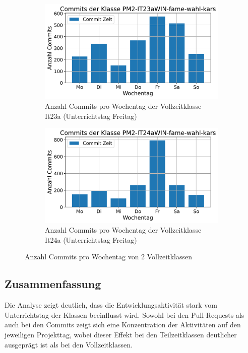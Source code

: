 \begin{figure}[htbp]
    \centering
    \begin{subfigure}[b]{0.48\textwidth}
        \centering
        \includegraphics[width=\textwidth]{Figures/commits-klasse-per-wochentag-23a.pdf}
         \caption{Anzahl Commits pro Wochentag der Vollzeitklasse It23a (Unterrichtstag Freitag)}
        \label{fig:anzahl-commits-pro-wochentag-it23a}
    \end{subfigure}
    \hfill
    \begin{subfigure}[b]{0.48\textwidth}
        \centering
        \includegraphics[width=\textwidth]{Figures/commits-klasse-per-wochentag-24a.pdf}
         \caption{Anzahl Commits pro Wochentag der Vollzeitklasse It24a (Unterrichtstag Freitag)}
        \label{fig:anzahl-commits-pro-wochentag-it24a}
    \end{subfigure}
    \caption{Anzahl Commits pro Wochentag von 2 Vollzeitklassen}
    \label{fig:anz-commits-vollzeit-pro-wochentag}
\end{figure}

\newpage
\subsection{Zusammenfassung}
Die Analyse zeigt deutlich, dass die Entwicklungsaktivität stark vom Unterrichtstag der Klassen beeinflusst wird. Sowohl bei den Pull-Requests als auch bei den Commits zeigt sich eine Konzentration der Aktivitäten auf den jeweiligen Projekttag, wobei dieser Effekt bei den Teilzeitklassen deutlicher ausgeprägt ist als bei den Vollzeitklassen.

